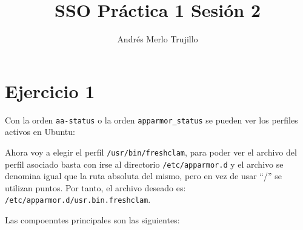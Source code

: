 \documentclass{article}
\title{SSO Práctica 1 Sesión 2}
\author{Andrés Merlo Trujillo}
\date{}
\begin{document}
\maketitle

\tableofcontents

\newpage

\section*{Ejercicio 1}
Con la orden \verb|aa-status| o la orden \verb|apparmor_status| se pueden ver los perfiles activos en Ubuntu:


Ahora voy a elegir el perfil \verb|/usr/bin/freshclam|, para poder ver el archivo del perfil asociado basta con irse al directorio \verb|/etc/apparmor.d| y el archivo se denomina igual que la ruta absoluta del mismo, pero en vez de usar ``/'' se utilizan puntos. Por tanto, el archivo deseado es: \verb|/etc/apparmor.d/usr.bin.freshclam|.



Las compoenntes principales son las siguientes:

\end{document}
